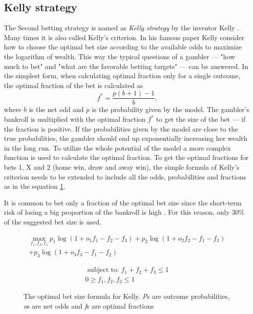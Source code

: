 \subsection{Kelly strategy}
The Second betting strategy is named as \textit{Kelly strategy} by the inventor Kelly \cite{kelly2011new}. Many times it is also called Kelly's criterion. In his famous paper \cite{kelly2011new} Kelly consider how to choose the optimal bet size according to the available odds to maximize the logarithm of wealth. This way the typical questions of a gambler --- "how much to bet" and "what are the favorable betting targets" ---  can be answered. In the simplest form, when calculating optimal fraction only for a single outcome, the optimal fraction of the bet is calculated as
\begin{equation}
f ^ { * } =  \frac { p ( b + 1 ) - 1 } { b }\text{,}
\end{equation}
where $b$ is the net odd and $p$ is the probability given by the model. The gambler's bankroll is multiplied with the optimal fraction $f^{*}$ to get the size of the bet --- if the fraction is positive. If the probabilities given by the model are close to the true probabilities, the gambler should end up exponentially increasing her wealth in the long run. To utilize the whole potential of the model a more complex function is used to calculate the optimal fraction. To get the optimal fractions for bets 1, X and 2 (home win, draw and away win), the simple formula of Kelly's criterion needs to be extended to include all the odds, probabilities and fractions as in the equation \ref{eq:kelly}.

It is common to bet only a fraction of the optimal bet size since the short-term risk of losing a big proportion of the bankroll is high \cite{maclean2011medium}. For this reason, only 30\% of the suggested bet size is used.
\begin{figure}
    \caption{The optimal bet size formula for Kelly. \textit{P}s are outcome probabilities, \textit{o}s are net odds and \textit{f}s are optimal fractions}
     \begin{equation}
        \begin{split}
            \max_{f_1, f_2, f_3} p_1  \log(1 + o_1 f_1 - f_2 - f_3) + p_2 \log(1 + o_2 f_2 - f_1 - f_3)  \\
            + p_3 \log(1 + o_3 f_3 - f_1 - f_2)
        \end{split}
     \end{equation}

    \begin{equation*}
        \begin{split}
            \text { subject to: }  f_1 + f_2 + f_3 \leq 1 \\
             0 \geq f_1, f_2, f_3 \leq 1
         \end{split}
    \end{equation*}
    \label{eq:kelly}
\end{figure}

